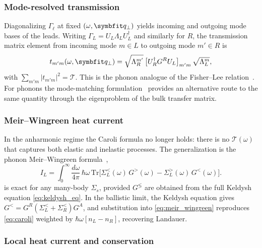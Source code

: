 \subsubsection{Mode-resolved transmission}

Diagonalizing $\Gamma_\ell$ at fixed $(\omega,\qp)$ yields incoming and
outgoing mode bases of the leads. Writing $\Gamma_L = U_L \Lambda_L
U_L^\dagger$ and similarly for $R$, the transmission matrix element from
incoming mode $m\in L$ to outgoing mode $m'\in R$ is
\begin{equation}\label{eq:mode_T}
  t_{m'm}(\omega,\qp)
  = \sqrt{\Lambda_R^{m'}}\,
    \bigl[U_R^\dagger G^R U_L\bigr]_{m'm}\,
    \sqrt{\Lambda_L^{m}},
\end{equation}
with $\sum_{m'm}|t_{m'm}|^2 = \mathcal{T}$. This is the phonon analogue
of the Fisher--Lee relation~\cite{fisher_relation_1981}.
For phonons the mode-matching formulation~\cite{ong_efficient_2015}
provides an alternative route to the same
quantity through the eigenproblem of the bulk transfer matrix.

\subsubsection{Meir--Wingreen heat current}

In the anharmonic regime the Caroli formula no longer holds: there is
no $\mathcal{T}(\omega)$ that captures both elastic and inelastic
processes. The generalization is the phonon Meir--Wingreen
formula~\cite{meir_landauer_1992,wang_nonequilibrium_2007,wang_quantum_2008},
\begin{equation}\label{eq:meir_wingreen}
  I_L
  = \int_0^\infty\!\frac{d\omega}{4\pi}\,\hbar\omega\,
    \mathrm{Tr}\bigl[
      \Sigma_L^<(\omega)\,G^>(\omega)
    - \Sigma_L^>(\omega)\,G^<(\omega)
    \bigr].
\end{equation}
 is exact for any
many-body $\Sigma_s$, provided $G^{\lessgtr}$ are obtained from the full
Keldysh equation \cref{eq:keldysh_eq}. In the ballistic limit, the
Keldysh equation gives $G^{<} = G^R(\Sigma_L^< + \Sigma_R^<)G^A$, and
substitution into \cref{eq:meir_wingreen} reproduces \cref{eq:caroli}
weighted by $\hbar\omega[n_L-n_R]$, recovering Landauer.

\subsubsection{Local heat current and conservation}

